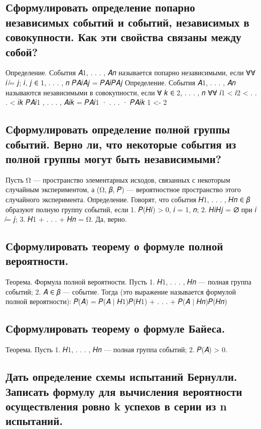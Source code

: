 \subsection{Сформулировать определение попарно независимых событий и событий, независимых в совокупности. Как эти свойства связаны между собой?}

Определение. События 𝐴1, . . . , 𝐴𝑛 называется попарно независимыми, если
∀∀ 𝑖 ̸= 𝑗; 𝑖, 𝑗 ∈ {1, . . . , 𝑛} 𝑃{𝐴𝑖𝐴𝑗} = 𝑃{𝐴𝑖}𝑃{𝐴𝑗}
Определение. События 𝐴1, . . . , 𝐴𝑛 называются независимыми в совокупности, если 
∀ 𝑘 ∈ {2, . . . , 𝑛} ∀∀ 𝑖1 < 𝑖2 < . . . < 𝑖𝑘 𝑃{𝐴𝑖1 , . . . , 𝐴𝑖𝑘 } = 𝑃{𝐴𝑖1 } · . . . · 𝑃{𝐴𝑖𝑘 }
1 <- 2


\subsection{Сформулировать определение полной группы событий. Верно ли, что некоторые события из полной группы могут быть независимыми?}

Пусть Ω — пространство элементарных исходов, связанных с некоторым случайным экспериментом, а (Ω, 𝛽, 𝑃) — вероятностное пространство этого случайного эксперимента. Определение. Говорят,  что события 𝐻1, . . . , 𝐻𝑛 ∈ 𝛽 образуют полную группу событий, если
1. 𝑃(𝐻𝑖) > 0, 𝑖 = 1, 𝑛; 
2. 𝐻𝑖𝐻𝑗 = ∅ при 𝑖 ̸= 𝑗; 
3. 𝐻1 + . . . + 𝐻𝑛 = Ω.
Да, верно.

\subsection{Сформулировать теорему о формуле полной вероятности.}

Теорема. Формула полной вероятности. Пусть 
1. 𝐻1, . . . , 𝐻𝑛 — полная группа событий;
2. 𝐴 ∈ 𝛽 — событие.
Тогда (это выражение называется формулой полной вероятности): 𝑃(𝐴) = 𝑃(𝐴 | 𝐻1)𝑃(𝐻1) + . . . + 𝑃(𝐴 | 𝐻𝑛)𝑃(𝐻𝑛)

\subsection{Сформулировать теорему о формуле Байеса.}

Теорема. Пусть 
1. 𝐻1, . . . , 𝐻𝑛 — полная группа событий; 
2. 𝑃(𝐴) > 0. 

\subsection{Дать определение схемы испытаний Бернулли. Записать формулу для вычисления вероятности осуществления ровно k успехов в серии из n испытаний.}

